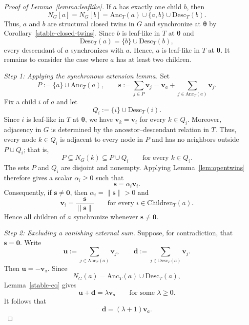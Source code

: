 \documentclass[11pt,reqno]{amsart}
\theoremstyle{definition}
\begin{document}
\begin{proof}[Proof of Lemma~\ref{lemma:leaflike}]
If $a$ has exactly one child $b$, then
\[
    N_G[a]=N_G[b]
    =\mathrm{Anc}_T(a)\cup\{a,b\}\cup\mathrm{Desc}_T(b).
\]
Thus, $a$ and $b$ are structural closed twins in $G$ and
synchronize at $\boldsymbol{\theta}$ by
Corollary~\ref{stable-closed-twins}.
Since $b$ is leaf-like in $T$ at $\boldsymbol{\theta}$ and
\[
    \mathrm{Desc}_T(a)=\{b\}\cup\mathrm{Desc}_T(b),
\]
every descendant of $a$ synchronizes with $a$.
Hence, $a$ is leaf-like in $T$ at $\boldsymbol{\theta}$.
It remains to consider the case where $a$ has at least two
children.

\medskip
\noindent
\textit{Step 1: Applying the synchronous extension lemma.}
Set
\[
    P:=\{a\}\cup\mathrm{Anc}_T(a),
    \qquad
    \mathbf{s}:=\sum_{j\in P}\mathbf{v}_j
    =\mathbf{v}_a+\sum_{j\in\mathrm{Anc}_T(a)}\mathbf{v}_j.
\]
Fix a child $i$ of $a$ and let
\[
    Q_i:=\{i\}\cup\mathrm{Desc}_T(i).
\]
Since $i$ is leaf-like in $T$ at $\boldsymbol{\theta}$,
we have $\mathbf{v}_k=\mathbf{v}_i$ for every $k\in Q_i$.
Moreover, adjacency in $G$ is determined by the
ancestor--descendant relation in $T$.
Thus, every node $k\in Q_i$ is adjacent to every node in $P$
and has no neighbors outside $P\cup Q_i$; that is,
\[
    P\subseteq N_G(k)\subseteq P\cup Q_i
    \qquad \text{for every } k\in Q_i.
\]
The sets $P$ and $Q_i$ are disjoint and nonempty.
Applying Lemma~\ref{lem:opentwins} therefore gives a scalar
$\alpha_i\ge0$ such that
\[
    \mathbf{s}=\alpha_i\mathbf{v}_i.
\]
Consequently, if $\mathbf{s}\neq\boldsymbol{0}$, then
$\alpha_i=\|\mathbf{s}\|>0$ and
\[
    \mathbf{v}_i=\frac{\mathbf{s}}{\|\mathbf{s}\|}
    \qquad \text{for every } i\in\mathrm{Children}_T(a).
\]
Hence all children of $a$ synchronize whenever
$\mathbf{s}\neq\boldsymbol{0}$.

\medskip
\noindent
\textit{Step 2: Excluding a vanishing external sum.}
Suppose, for contradiction, that $\mathbf{s}=\boldsymbol{0}$.
Write
\[
    \mathbf{u}:=\sum_{j\in\mathrm{Anc}_T(a)}\mathbf{v}_j,
    \qquad
    \mathbf{d}:=\sum_{j\in\mathrm{Desc}_T(a)}\mathbf{v}_j.
\]
Then $\mathbf{u}=-\mathbf{v}_a$.
Since
\[
    N_G(a)=\mathrm{Anc}_T(a)\cup\mathrm{Desc}_T(a),
\]
Lemma~\ref{stable-eq} gives
\[
    \mathbf{u}+\mathbf{d}=\lambda\mathbf{v}_a
    \qquad \text{for some } \lambda\ge0.
\]
It follows that
\[
    \mathbf{d}=(\lambda+1)\mathbf{v}_a.
\]


\end{proof}
\end{document}

